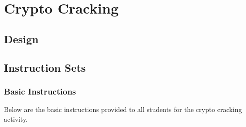 \providecommand{\heading}[1]{\section{#1}}



\providecommand{\subheading}[1]{\subsection{#1}}







\heading{Crypto Cracking}\label{subsec:CTFs-cc}







    \subheading{Design}







    \subheading{Instruction Sets}\label{subsubsec:CTFs-cc-instructions}







        \subsubsection{Basic Instructions}



            \noindent



            Below are the basic instructions provided to all students for the crypto cracking activity.



